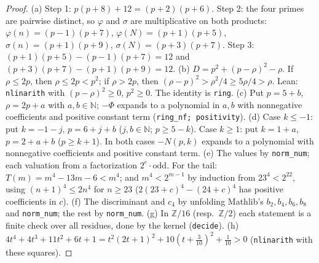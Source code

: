\documentclass[11pt,reqno]{amsart}
\newcommand{\ph}{\varphi}
\newcommand{\sig}{\sigma}
\theoremstyle{definition}
\begin{document}
\begin{proof}
(a) Step 1: \(p(p+8)+12=(p+2)(p+6)\). Step 2: the four primes are pairwise distinct, so \(\ph\) and \(\sig\) are multiplicative on both products: \(\ph(n)=(p-1)(p+7)\), \(\ph(N)=(p+1)(p+5)\), \(\sig(n)=(p+1)(p+9)\), \(\sig(N)=(p+3)(p+7)\). Step 3: \((p+1)(p+5)-(p-1)(p+7)=12\) and \((p+3)(p+7)-(p+1)(p+9)=12\).
(b) \(D=p^2+(p-\rho)^2-\rho\). If \(\rho\le 2p\), then \(\rho\le 2p<p^2\); if \(\rho>2p\), then \((\rho-p)^2>\rho^2/4\ge 5\rho/4>\rho\). Lean: \texttt{nlinarith} with \((p-\rho)^2\ge0\), \(p^2\ge0\). The identity is \texttt{ring}.
(c) Put \(p=5+b\), \(\rho=2p+a\) with \(a,b\in\mathbb N\); \(-\Phi\) expands to a polynomial in \(a,b\) with nonnegative coefficients and positive constant term (\texttt{ring\_nf; positivity}).
(d) Case \(k\le -1\): put \(k=-1-j\), \(p=6+j+b\) (\(j,b\in\mathbb N\); \(p\ge 5-k\)). Case \(k\ge 1\): put \(k=1+a\), \(p=2+a+b\) (\(p\ge k+1\)). In both cases \(-N(p,k)\) expands to a polynomial with nonnegative coefficients and positive constant term.
(e) The values by \texttt{norm\_num}; each valuation from a factorization \(2^e\cdot\text{odd}\). For the tail: \(T(m)=m^4-13m-6<m^4\); and \(m^4<2^{m-1}\) by induction from \(23^4<2^{22}\), using \((n+1)^4\le 2n^4\) for \(n\ge 23\) (\(2(23+c)^4-(24+c)^4\) has positive coefficients in \(c\)).
(f) The discriminant and \(c_4\) by unfolding Mathlib's \(b_2,b_4,b_6,b_8\) and \texttt{norm\_num}; the rest by \texttt{norm\_num}.
(g) In \(\mathbb Z/16\) (resp.\ \(\mathbb Z/2\)) each statement is a finite check over all residues, done by the kernel (\texttt{decide}). (h) \(4t^4+4t^3+11t^2+6t+1=t^2(2t+1)^2+10(t+\tfrac{3}{10})^2+\tfrac1{10}>0\) (\texttt{nlinarith} with these squares).
\end{proof}
\end{document}
